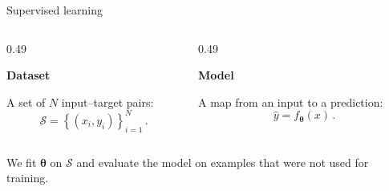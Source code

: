 \documentclass[12pt,aspectratio=169]{beamer}
\begin{document}
\begin{frame}{Supervised learning}

	\begin{columns}[T,onlytextwidth]
		\begin{column}{0.49\textwidth}
			\begin{tcolorbox}[nndsblue,height=0.42\textheight]
				\textbf{\color{darkcerulean}Dataset}

				A set of $N$ input--target pairs:
				\begin{equation}
					\mathcal{S}=\left\{(x_i,y_i)\right\}_{i=1}^{N} \,.
				\end{equation}
			\end{tcolorbox}
		\end{column}
		\begin{column}{0.49\textwidth}
			\begin{tcolorbox}[nndsgreen,height=0.42\textheight]
				\textbf{\color{darkgreen}Model}

				A map from an input to a prediction:
				\begin{equation}
					\hat{y}=f_{\boldsymbol{\theta}}(x) \,.
				\end{equation}
			\end{tcolorbox}
		\end{column}
	\end{columns}

	\vspace{1em}
	We fit $\boldsymbol{\theta}$ on $\mathcal{S}$ and evaluate the model on examples that were not used for training.

\end{frame}
\end{document}
